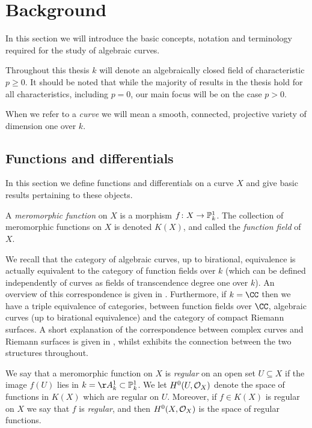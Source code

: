 \chapter{Background}\label{chapterbackground}

In this section we will introduce the basic concepts, notation and terminology required for the study of algebraic curves.

Throughout this thesis $k$ will denote an algebraically closed field of characteristic $p \geq 0$.
It should be noted that while the majority of results in the thesis hold for all characteristics, including $p=0$, our main focus will be on the case $p > 0$.

When we refer to a \emph{curve} we will mean a smooth, connected, projective variety of dimension one over $k$.

\section{Functions and differentials}

In this section we define functions and differentials on a curve $X$ and give basic results pertaining to these objects.


A \emph{meromorphic function} on $X$ is a morphism $f \colon X \rightarrow {\mathbb P}_k^1$.
The collection of meromorphic functions on $X$ is denoted $K(X)$, and called the \emph{function field} of $X$.

We recall that the category of algebraic curves, up to birational, equivalence is actually equivalent to the category of function fields over $k$ (which can be defined independently of curves as fields of transcendence degree one over $k$).
An overview of this correspondence is given in \cite[Appendix B]{stichtenoth}.
Furthermore, if $k = \CC$ then we have a triple equivalence of categories, between function fields over $\CC$, algebraic curves (up to birational equivalence) and the category of compact Riemann surfaces. 
A short explanation of the correspondence between complex curves and Riemann surfaces is given in \cite[Chap.\ 1, \S 2]{griffiths}, whilst \cite{miranda} exhibits the connection between the two structures throughout.


We say that a meromorphic function on $X$ is \emph{regular} on an open set $U \subseteq X$ if the image $f(U)$ lies in $k = \AA_k^1 \subset \PP_k^1$.
We let $H^0(U,{\cal O}_X)$ denote the space of functions in $K(X)$ which are regular on $U$.
Moreover, if $f \in K(X)$ is regular on $X$ we say that $f$ is \emph{regular}, and then $H^0(X,{\cal O}_X)$ is the space of regular functions.

